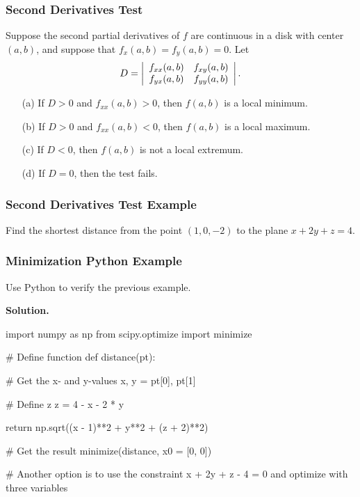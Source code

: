 \documentclass{beamer}
\begin{document}
\begin{frame}
\frametitle{Second Derivatives Test}
Suppose the second partial derivatives of $f$ are continuous in a disk with center $(a, b)$, and suppose that $f_x(a, b) = f_y(a, b) = 0$. Let
$$
D = \left|\begin{array}{c c} f_{xx}(a, b)	&	f_{xy}(a, b)\\ f_{yx}(a, b)	&	f_{yy}(a, b)\end{array}\right|.
$$
\begin{enumerate}
\item[(a)] If $D >0$ and $f_{xx} (a, b) > 0$, then $f(a,b)$ is a local minimum.
\item[(b)] If $D > 0$ and $f_{xx}(a, b) < 0$, then $f(a, b)$ is a local maximum.
\item[(c)] If $D < 0$, then $f(a, b)$ is not a local extremum.
\item[(d)] If $D = 0$, then the test fails.
\end{enumerate}

\end{frame}


\begin{frame}[t]
\frametitle{Second Derivatives Test Example}
\begin{Example}
Find the shortest distance from the point $(1, 0, -2)$ to the plane $x + 2y + z = 4$.
\end{Example}
\end{frame}

\begin{frame}[fragile]
\frametitle{Minimization Python Example}
\small

\begin{Example}
Use Python to verify the previous example.
\end{Example}

{\bf Solution.}
{
\linespread{0.8}
\tiny
\begin{verbatim*}
import numpy as np
from scipy.optimize import minimize

# Define function
def distance(pt):
    
    # Get the x- and y-values
    x, y = pt[0], pt[1]
    
    # Define z 
    z = 4 - x - 2 * y
    
    return np.sqrt((x - 1)**2 + y**2 + (z + 2)**2)

# Get the result   
minimize(distance, x0 = [0, 0]) 

# Another option is to use the constraint x + 2y + z - 4 = 0 and optimize with three variables 
\end{verbatim*}
}

\end{frame}
\end{document}
